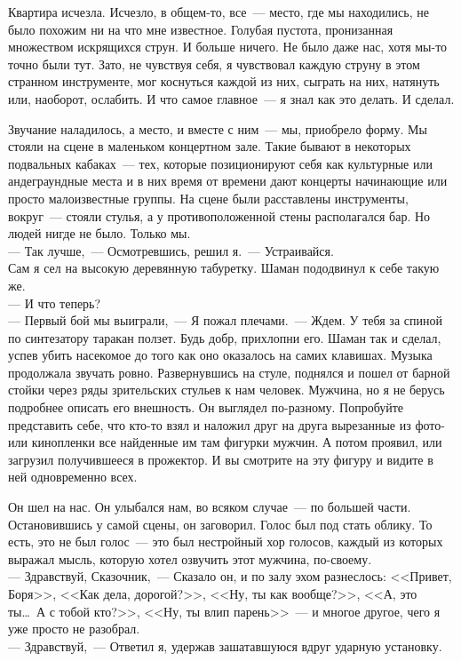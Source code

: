 Квартира исчезла. Исчезло, в общем-то, все~--- место, где мы находились, не 
было похожим ни на что мне известное. Голубая пустота, пронизанная множеством 
искрящихся струн. И больше ничего. Не было даже нас, хотя мы-то точно были тут. 
Зато, не чувствуя себя, я чувствовал каждую струну в этом странном инструменте, 
мог коснуться каждой из них, сыграть на них, натянуть или, наоборот, ослабить. 
И что самое главное~--- я знал как это делать. И сделал.


Звучание наладилось, а место, и вместе с ним~--- мы, приобрело форму. Мы стояли 
на сцене в маленьком концертном зале. Такие бывают в некоторых подвальных 
кабаках~--- тех, которые позиционируют себя как культурные или андеграундные места и в них 
время от времени дают концерты начинающие или просто малоизвестные группы. На 
сцене были расставлены инструменты, вокруг~--- стояли стулья, а у 
противоположенной стены располагался бар. Но людей нигде не было. Только мы.\\
--- Так лучше,~--- Осмотревшись, решил я.~--- Устраивайся.\\
Сам я сел на высокую деревянную табуретку. Шаман пододвинул к себе такую же.\\
--- И что теперь?\\
--- Первый бой мы выиграли,~--- Я пожал плечами.~--- Ждем. У тебя за спиной по 
синтезатору таракан ползет. Будь добр, прихлопни его.
Шаман так и сделал, успев убить насекомое до того как оно оказалось на самих 
клавишах. Музыка продолжала звучать ровно. Развернувшись на стуле, поднялся и 
пошел от барной стойки через ряды зрительских стульев к нам человек. Мужчина, 
но я не берусь подробнее описать его внешность. Он выглядел по-разному. Попробуйте 
представить себе, что кто-то взял и наложил друг на друга вырезанные из фото- 
или кинопленки все найденные им там фигурки мужчин. А потом проявил, или 
загрузил получившееся в прожектор. И вы смотрите на эту фигуру и видите в ней 
одновременно всех.

Он шел на нас. Он улыбался нам, во всяком случае~--- по большей части. 
Остановившись у самой сцены, он заговорил. Голос был под стать облику. То есть, 
это не был голос~--- это был нестройный хор голосов, каждый из которых выражал 
мысль, которую хотел озвучить этот мужчина, по-своему.\\
--- Здравствуй, Сказочник,~--- Сказало он, и по залу эхом разнеслось: <<Привет, 
Боря>>, <<Как дела, дорогой?>>, <<Ну, ты как вообще?>>, <<А, это ты\ldots\ А с 
тобой кто?>>, <<Ну, ты влип парень>>~--- и многое другое, чего я уже просто не разобрал.\\
--- Здравствуй,~--- Ответил я, удержав зашатавшуюся вдруг ударную установку.\\

